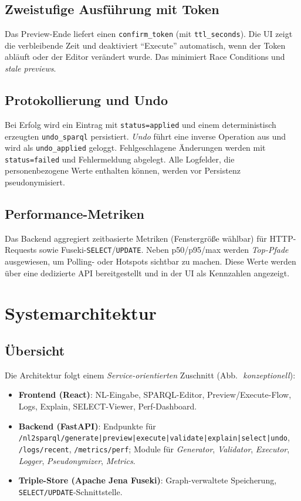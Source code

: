 \subsection{Zweistufige Ausführung mit Token}
Das Preview-Ende liefert einen \texttt{confirm\_token} (mit \texttt{ttl\_seconds}). Die UI zeigt die verbleibende Zeit und deaktiviert \enquote{Execute} automatisch, wenn der Token abläuft oder der Editor verändert wurde. Das minimiert Race Conditions und \emph{stale previews}.

\subsection{Protokollierung und Undo}
Bei Erfolg wird ein Eintrag mit \texttt{status=applied} und einem deterministisch erzeugten \texttt{undo\_sparql} persistiert. \emph{Undo} führt eine inverse Operation aus und wird als \texttt{undo\_applied} geloggt. Fehlgeschlagene Änderungen werden mit \texttt{status=failed} und Fehlermeldung abgelegt. Alle Logfelder, die personenbezogene Werte enthalten können, werden vor Persistenz pseudonymisiert.

\subsection{Performance-Metriken}
Das Backend aggregiert zeitbasierte Metriken (Fenstergröße wählbar) für HTTP-Requests sowie Fuseki-\texttt{SELECT}/\texttt{UPDATE}. Neben p50/p95/max werden \emph{Top-Pfade} ausgewiesen, um Polling- oder Hotspots sichtbar zu machen. Diese Werte werden über eine dedizierte API bereitgestellt und in der UI als Kennzahlen angezeigt.

\section{Systemarchitektur}
\subsection{Übersicht}
Die Architektur folgt einem \emph{Service-orientierten} Zuschnitt (Abb.\,~\emph{konzeptionell}):
\begin{itemize}
  \item \textbf{Frontend (React)}: NL-Eingabe, SPARQL-Editor, Preview/Execute-Flow, Logs, Explain, SELECT-Viewer, Perf-Dashboard.
  \item \textbf{Backend (FastAPI)}: Endpunkte für \texttt{/nl2sparql/generate|preview|execute|validate|explain|select|undo}, \texttt{/logs/recent}, \texttt{/metrics/perf}; Module für \emph{Generator}, \emph{Validator}, \emph{Executor}, \emph{Logger}, \emph{Pseudonymizer}, \emph{Metrics}.
  \item \textbf{Triple-Store (Apache Jena Fuseki)}: Graph-verwaltete Speicherung, \texttt{SELECT/UPDATE}-Schnittstelle.
\end{itemize}

